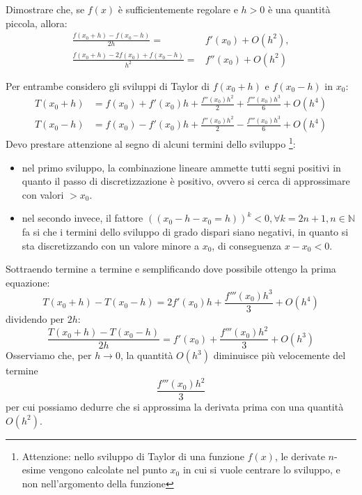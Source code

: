 \begin{exercise}[1.2]
	Dimostrare che, se $f(x)$ \`e sufficientemente regolare e $h>0$ \`e una 
	quantit\`a piccola, allora:
	\begin{equation*}
		\begin{split}
			\frac{f(x_{0}+h) - f(x_{0}-h)}{2h} =& f'(x_{0}) + O(h^{2}), \\
			\frac{f(x_{0}+h) - 2f(x_{0}) + f(x_{0}-h)}{h^{2}} =& f''(x_{0}) + O(h^{2}) 
		\end{split}
	\end{equation*}
\end{exercise}
Per entrambe considero gli sviluppi di Taylor di $f(x_{0}+h)$ e $f(x_{0}-h)$ in
$x_{0}$:
\begin{equation*}
	\begin{split}
		T(x_{0} + h)& = f(x_{0}) + f'(x_{0})h + \frac{f''(x_{0})h^{2}}{2} + 
		\frac{f'''(x_{0})h^{3}}{6} + O(h^{4}) \\ 
		T(x_{0} - h)& = f(x_{0}) - f'(x_{0})h + \frac{f''(x_{0})h^{2}}{2} - 
		\frac{f'''(x_{0})h^{3}}{6} + O(h^{4})
	\end{split}
\end{equation*}
Devo prestare attenzione al segno di alcuni termini dello sviluppo
\footnote{Attenzione: nello sviluppo di Taylor di una funzione $f(x)$,  le
derivate $n$-esime vengono calcolate nel punto $x_{0}$ in cui si vuole 
centrare lo sviluppo, e non nell'argomento della funzione}:
\begin{itemize}
	\item nel primo sviluppo, la combinazione lineare ammette tutti segni 
	positivi in quanto il passo di discretizzazione \`e positivo, ovvero si cerca
	di approssimare con valori $ > x_{0}$.
	\item nel secondo invece, il fattore $((x_{0} - h - x_{0} =h))^{k} < 0, 
	\forall{k=2n+1, n \in \mathbb{N}}$ fa si che i termini dello sviluppo di 
	grado dispari siano negativi, in quanto si sta discretizzando con un valore 
	minore a $x_{0}$, di conseguenza $x - x_{0} < 0$.
\end{itemize}
Sottraendo termine a termine e semplificando dove possibile ottengo la prima equazione: 
\begin{equation*}
	T(x_{0}+h) - T(x_{0}-h) = 2f'(x_{0})h + \frac{f'''(x_{0})h^{3}}{3} + O(h^{4}) 
\end{equation*}
dividendo per $2h$: 
\begin{equation*}
	\frac{T(x_{0}+h) - T(x_{0}-h)}{2h} = f'(x_{0}) + \frac{f'''(x_{0})h^{2}}{3}  +
	O(h^{3})
\end{equation*}
Osserviamo che, per $h \rightarrow 0$, la quantit\`a $O(h^{3})$ diminuisce pi\`u 
velocemente del termine $$\frac{f'''(x_{0})h^{2}}{3}$$ per cui possiamo dedurre
che si approssima la derivata prima con una quantit\`a $O(h^{2})$.

